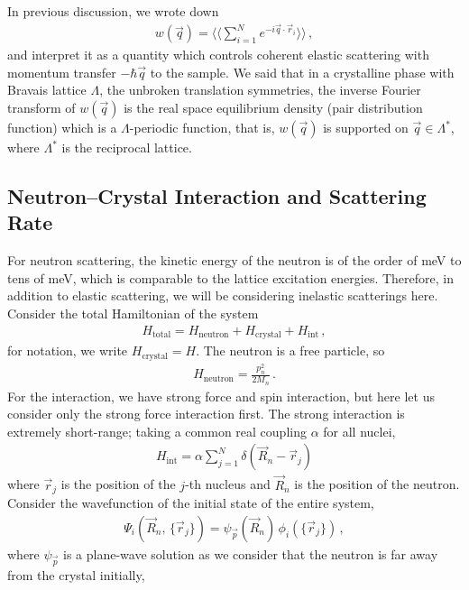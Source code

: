 \documentclass[11pt, oneside]{book}
\theoremstyle{break}
\theoremstyle{break}
\begin{document}
In previous discussion, we wrote down
\begin{align*}
w(\vec{q}) = \langle\langle \sum_{i=1}^N e^{-i\vec{q}\cdot \vec{r}_i}\rangle\rangle\,,
\end{align*}
and interpret it as a quantity which controls coherent elastic scattering with momentum transfer $-\hbar\vec{q}$ to the sample. We said that in a crystalline phase with Bravais lattice $\Lambda$, the unbroken translation symmetries, the inverse Fourier transform of $w(\vec{q})$ is the real space equilibrium density (pair distribution function) which is a $\Lambda$-periodic function, that is, $w(\vec{q})$ is supported on $\vec{q}\in \Lambda^*$, where $\Lambda^*$ is the reciprocal lattice. \\

\subsection{Neutron--Crystal Interaction and Scattering Rate}
For neutron scattering, the kinetic energy of the neutron is of the order of meV to tens of meV, which is comparable to the lattice excitation energies. Therefore, in addition to elastic scattering, we will be considering  inelastic scatterings here. Consider the total Hamiltonian of the system 
\begin{align*}
H_{\text{total}} =
H_{\text{neutron}} + H_{\text{crystal}} + H_{\text{int}}\,, 
\end{align*}
for notation, we write $H_{\text{crystal}} = H$. The neutron is a free particle, so 
\begin{align*}
H_{\text{neutron}} = \frac{p_n^2}{2M_n}\,.
\end{align*}
For the interaction, we have strong force and spin interaction, but here let us consider only the strong force interaction first. The strong interaction is extremely short-range; taking a common real coupling $\alpha$ for all nuclei,
 \begin{align*}
H_{\text{int}} = \alpha \sum_{j=1}^N \delta (\vec{R}_n - \vec{r}_j)
\end{align*}
where $\vec{r}_j$ is the position of the $j$-th nucleus and $\vec{R}_n$ is the position of the neutron. Consider the wavefunction of the initial state of the entire system, 
\begin{align*}
\Psi_i(\vec{R}_n, \, \{\vec{r}_j\}) = \psi_{\vec{p}}(\vec{R}_n) \, \phi_i(\{\vec{r}_j\})\,,
\end{align*}
where $\psi_{\vec{p}}$ is a plane-wave solution as we consider that the neutron is far away from the crystal initially, 
\end{document}
